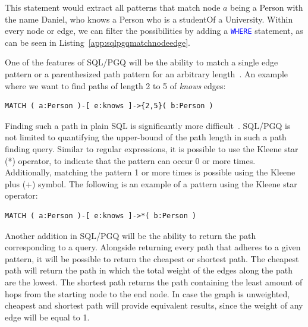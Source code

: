 This statement would extract all patterns that match node $a$ being a Person with the name Daniel, who knows a Person who is a studentOf a University. Within every node or edge, we can filter the possibilities by adding a \textcolor{blue}{\texttt{WHERE}} statement, as can be seen in Listing~\ref{app:sqlpgqmatchnodeedge}.

One of the features of SQL/PGQ will be the ability to match a single edge pattern or a parenthesized path pattern for an arbitrary length~\cite{Deutsch2021}. 
An example where we want to find paths of length 2 to 5 of \textit{knows} edges: 
\begin{lstlisting}[caption=Path length of 2 to 5 knows edges, label=app:sqlpgqmatch25knows] 
MATCH ( a:Person )-[ e:knows ]->{2,5}( b:Person )
\end{lstlisting}
Finding such a path in plain SQL is significantly more difficult~\cite{oracle-sql-example}. 
SQL/PGQ is not limited to quantifying the upper-bound of the path length in such a path finding query. 
Similar to regular expressions, it is possible to use the Kleene star (*) operator, to indicate that the pattern can occur 0 or more times. 
Additionally, matching the pattern 1 or more times is possible using the Kleene plus (+) symbol.
The following is an example of a pattern using the Kleene star operator: 
\begin{lstlisting}[caption=Path length of arbitrarily many knows edges, label=app:sqlpgqmatchkleene] 
MATCH ( a:Person )-[ e:knows ]->*( b:Person )
\end{lstlisting}

Another addition in SQL/PGQ will be the ability to return the path corresponding to a query.
Alongside returning every path that adheres to a given pattern, it will be possible to return the cheapest or shortest path. 
The cheapest path will return the path in which the total weight of the edges along the path are the lowest.
The shortest path returns the path containing the least amount of hops from the starting node to the end node.
In case the graph is unweighted, cheapest and shortest path will provide equivalent results, since the weight of any edge will be equal to 1.


